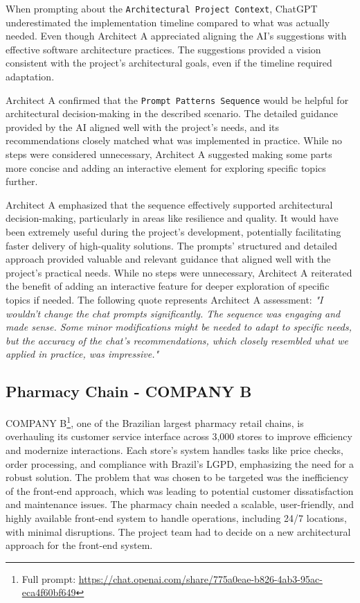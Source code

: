 \documentclass[runningheads]{llncs}
\begin{document}
When prompting about the \texttt{Architectural Project Context}, ChatGPT underestimated the implementation timeline compared to what was actually needed. Even though Architect A appreciated aligning the AI's suggestions with effective software architecture practices. The suggestions provided a vision consistent with the project's architectural goals, even if the timeline required adaptation.

Architect A confirmed that the \texttt{Prompt Patterns Sequence} would be helpful for architectural decision-making in the described scenario. The detailed guidance provided by the AI aligned well with the project's needs, and its recommendations closely matched what was implemented in practice. While no steps were considered unnecessary, Architect A suggested making some parts more concise and adding an interactive element for exploring specific topics further.

Architect A emphasized that the sequence effectively supported architectural decision-making, particularly in areas like resilience and quality. It would have been extremely useful during the project's development, potentially facilitating faster delivery of high-quality solutions. The prompts' structured and detailed approach provided valuable and relevant guidance that aligned well with the project's practical needs. While no steps were unnecessary, Architect A reiterated the benefit of adding an interactive feature for deeper exploration of specific topics if needed. The following quote represents Architect A assessment: \textit{"I wouldn't change the chat prompts significantly. The sequence was engaging and made sense. Some minor modifications might be needed to adapt to specific needs, but the accuracy of the chat's recommendations, which closely resembled what we applied in practice, was impressive."}

\subsection{Pharmacy Chain - COMPANY B}

COMPANY B\footnote{Full prompt: \url{https://chat.openai.com/share/775a0eae-b826-4ab3-95ac-eca4f60bf649}}, one of the Brazilian largest pharmacy retail chains, is overhauling its customer service interface across 3,000 stores to improve efficiency and modernize interactions. Each store’s system handles tasks like price checks, order processing, and compliance with Brazil’s LGPD, emphasizing the need for a robust solution. The problem that was chosen to be targeted was the inefficiency of the front-end approach, which was leading to potential customer dissatisfaction and maintenance issues. The pharmacy chain needed a scalable, user-friendly, and highly available front-end system to handle operations, including 24/7 locations, with minimal disruptions. The project team had to decide on a new architectural approach for the front-end system. 
\end{document}
